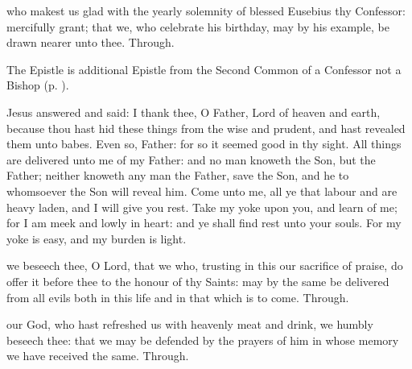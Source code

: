 \collect\label{EusebiusCollect}
 who makest us glad with the yearly solemnity of blessed Eusebius thy Confessor: mercifully grant; that we, who celebrate his birthday, may by his example, be drawn nearer unto thee. Through.

\begin{rubric}
	The Epistle is additional Epistle from the Second Common of a Confessor not a Bishop (p. \pageref{Philippians37}).
\end{rubric}


 Jesus answered and said: I thank thee, O Father, Lord of heaven and earth, because thou hast hid these things from the wise and prudent, and hast revealed them unto babes. Even so, Father: for so it seemed good in thy sight. All things are delivered unto me of my Father: and no man knoweth the Son, but the Father; neither knoweth any man the Father, save the Son, and he to whomsoever the Son will reveal him. Come unto me, all ye that labour and are heavy laden, and I will give you rest. Take my yoke upon you, and learn of me; for I am meek and lowly in heart: and ye shall find rest unto your souls. For my yoke is easy, and my burden is light.


\secret\label{EusebiusSecret}
 we beseech thee, O Lord, that we who, trusting in this our sacrifice of praise, do offer it before thee to the honour of thy Saints: may by the same be delivered from all evils both in this life and in that which is to come. Through.


\postcommunion\label{EusebiusPostcommunion}
 our God, who hast refreshed us with heavenly meat and drink, we humbly beseech thee: that we may be defended by the prayers of him in whose memory we have received the same. Through.


